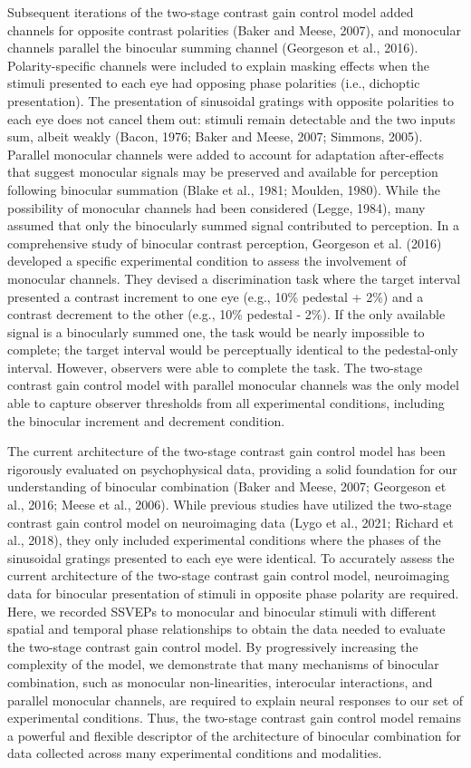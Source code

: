 \documentclass[
  12pt,
]{article}
\begin{document}
Subsequent iterations of the two-stage contrast gain control model added
channels for opposite contrast polarities (Baker and Meese, 2007), and
monocular channels parallel the binocular summing channel (Georgeson et
al., 2016). Polarity-specific channels were included to explain masking
effects when the stimuli presented to each eye had opposing phase
polarities (i.e., dichoptic presentation). The presentation of
sinusoidal gratings with opposite polarities to each eye does not cancel
them out: stimuli remain detectable and the two inputs sum, albeit
weakly (Bacon, 1976; Baker and Meese, 2007; Simmons, 2005). Parallel
monocular channels were added to account for adaptation after-effects
that suggest monocular signals may be preserved and available for
perception following binocular summation (Blake et al., 1981; Moulden,
1980). While the possibility of monocular channels had been considered
(Legge, 1984), many assumed that only the binocularly summed signal
contributed to perception. In a comprehensive study of binocular
contrast perception, Georgeson et al. (2016) developed a specific
experimental condition to assess the involvement of monocular channels.
They devised a discrimination task where the target interval presented a
contrast increment to one eye (e.g., 10\% pedestal + 2\%) and a contrast
decrement to the other (e.g., 10\% pedestal - 2\%). If the only
available signal is a binocularly summed one, the task would be nearly
impossible to complete; the target interval would be perceptually
identical to the pedestal-only interval. However, observers were able to
complete the task. The two-stage contrast gain control model with
parallel monocular channels was the only model able to capture observer
thresholds from all experimental conditions, including the binocular
increment and decrement condition.

The current architecture of the two-stage contrast gain control model
has been rigorously evaluated on psychophysical data, providing a solid
foundation for our understanding of binocular combination (Baker and
Meese, 2007; Georgeson et al., 2016; Meese et al., 2006). While previous
studies have utilized the two-stage contrast gain control model on
neuroimaging data (Lygo et al., 2021; Richard et al., 2018), they only
included experimental conditions where the phases of the sinusoidal
gratings presented to each eye were identical. To accurately assess the
current architecture of the two-stage contrast gain control model,
neuroimaging data for binocular presentation of stimuli in opposite
phase polarity are required. Here, we recorded SSVEPs to monocular and
binocular stimuli with different spatial and temporal phase
relationships to obtain the data needed to evaluate the two-stage
contrast gain control model. By progressively increasing the complexity
of the model, we demonstrate that many mechanisms of binocular
combination, such as monocular non-linearities, interocular
interactions, and parallel monocular channels, are required to explain
neural responses to our set of experimental conditions. Thus, the
two-stage contrast gain control model remains a powerful and flexible
descriptor of the architecture of binocular combination for data
collected across many experimental conditions and modalities.
\end{document}
